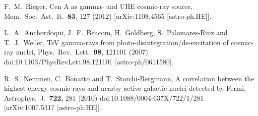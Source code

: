 \documentclass[aps,prd,twocolumn,superscriptaddress,tightenlines,nofootinbib]{revtex4-1}
\begin{document}
\begin{thebibliography}{99}
  F.~M.~Rieger,
  {\color{rossoCP3}  Cen A as gamma- and UHE cosmic-ray source},
  Mem.\ Soc.\ Ast.\ It.\  {\bf 83}, 127 (2012)
  [arXiv:1108.4565 [astro-ph.HE]].


  L.~A.~Anchordoqui, J.~F.~Beacom, H.~Goldberg, S.~Palomares-Ruiz and T.~J.~Weiler,
   {\color{rossoCP3}  TeV gamma-rays from photo-disintegration/de-excitation of cosmic-ray nuclei},
  Phys.\ Rev.\ Lett.\  {\bf 98}, 121101 (2007)
  doi:10.1103/PhysRevLett.98.121101
  [astro-ph/0611580].



  R.~S.~Nemmen, C.~Bonatto and T.~Storchi-Bergmann,
   {\color{rossoCP3}  A correlation between the highest energy cosmic rays and nearby active galactic nuclei detected by Fermi},
  Astrophys.\ J.\  {\bf 722}, 281 (2010)
  doi:10.1088/0004-637X/722/1/281
  [arXiv:1007.5317 [astro-ph.HE]].








\end{thebibliography}
\end{document}
